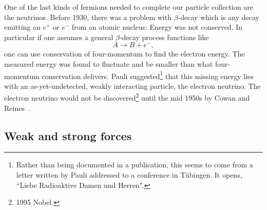 One of the last kinds of fermions needed to complete our particle collection
are the neutrinos. Before 1930, there was a problem with $\beta$-decay
which is any decay emitting an $e^+$ or $e^-$ from
an atomic nucleus: Energy was not conserved. In particular if one assumes
a general $\beta$-decay process functions like
\begin{equation}
  A\to B+e^-,
\end{equation}
one can use conservation of four-momentum to find the electron energy.
The measured energy was found to fluctuate and be smaller than what four-momentum
conservation delivers. Pauli
suggested\footnote{Rather than being documented in a publication, this seems to
come from a letter written by Pauli addressed to a conference in T\"ubingen.
It opens, ``Liebe Radioaktive Damen und Herren".} that this missing energy
lies with an as-yet-undetected, weakly interacting particle, the
electron neutrino. The electron neutrino would not be 
discovered\footnote{1995 Nobel.}
until the mid 1950s by Cowan and Reines~\cite{Cowan:1956rrn}.

\subsection{Weak and strong forces}

